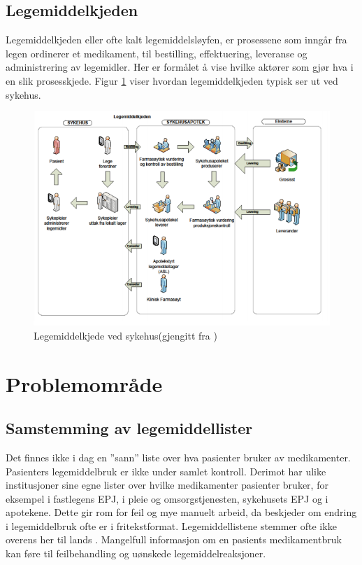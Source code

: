\subsection{Legemiddelkjeden}
Legemiddelkjeden eller ofte kalt legemiddelsløyfen, er prosessene som inngår fra legen ordinerer et medikament, til bestilling, effektuering, leveranse og administrering av legemidler. Her er formålet å vise hvilke aktører som gjør hva i en slik prosesskjede. Figur \ref{legemiddelkjede} viser hvordan legemiddelkjeden typisk ser ut ved sykehus. 
\begin{figure}[!h]
\centering
\includegraphics[width=140mm]{images/legemiddelkjede.PNG}
\caption{Legemiddelkjede ved sykehus(gjengitt fra \citep{Legemiddelberedskap_sykehusapotekene})}
\label{legemiddelkjede}
\end{figure}


\section{Problemområde}
\subsection{Samstemming av legemiddellister}
Det finnes ikke i dag en ''sann''  liste over hva pasienter bruker av medikamenter. Pasienters legemiddelbruk er ikke under samlet kontroll. Derimot har ulike institusjoner sine egne lister over hvilke medikamenter pasienter bruker, for eksempel i fastlegens EPJ, i pleie og omsorgstjenesten, sykehusets EPJ og i apotekene. Dette gir rom for feil og mye manuelt arbeid, da beskjeder om endring i legemiddelbruk ofte er i fritekstformat. Legemiddellistene stemmer ofte ikke overens her til lands \citep{fastlegen_hjemmesykepleien_samstemming}. Mangelfull informasjon om en pasients medikamentbruk kan føre til feilbehandling og uønskede legemiddelreaksjoner\citep{JAMA_1995}.

